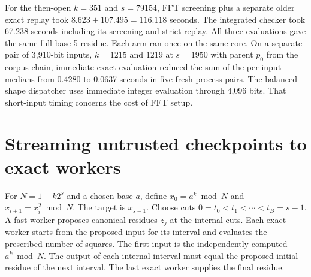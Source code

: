\documentclass[11pt,a4paper,oneside,openany]{report}
\begin{document}
For the then-open $k=351$ and $s=79154$, FFT screening plus a separate older exact replay took $8.623+107.495=116.118$ seconds. The integrated checker took 67.238 seconds including its screening and strict replay. All three evaluations gave the same full base-5 residue. Each arm ran once on the same core. On a separate pair of 3,910-bit inputs, $k=1215$ and $1219$ at $s=1950$ with parent $p_0$ from the corpus chain, immediate exact evaluation reduced the sum of the per-input medians from 0.4280 to 0.0637 seconds in five fresh-process pairs. The balanced-shape dispatcher uses immediate integer evaluation through 4,096 bits. That short-input timing concerns the cost of FFT setup.

\section{Streaming untrusted checkpoints to exact workers}
For $N=1+k2^s$ and a chosen base $a$, define $x_0=a^k\bmod N$ and $x_{i+1}=x_i^2\bmod N$. The target is $x_{s-1}$. Choose cuts $0=t_0<t_1<\cdots<t_B=s-1$. A fast worker proposes canonical residues $z_j$ at the internal cuts. Each exact worker starts from the proposed input for its interval and evaluates the prescribed number of squares. The first input is the independently computed $a^k\bmod N$. The output of each internal interval must equal the proposed initial residue of the next interval. The last exact worker supplies the final residue.
\end{document}

